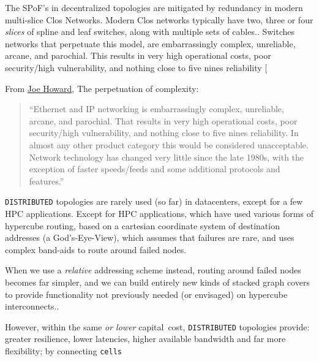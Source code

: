 \documentclass[../HFT-main.tex]{subfiles}
\begin{document}
 The SPoF's in decentralized topologies are mitigated by redundancy in modern multi-slice Clos Networks. Modern Clos networks typically have two, three or four \emph{slices} of spline and leaf switches, along with multiple sets of cables..
Switches  networks that perpetuate this model, are embarrassingly complex, unreliable, arcane, and parochial. This results in very high operational costs, poor security/high vulnerability, and nothing close to five nines reliability
 [{From \href{https://www.linkedin.com/pulse/why-network-industry-has-been-stuck-1980s-ciscos-embrace-joe-howard}{Joe Howard}, The perpetuation of complexity:
 
 
\begin{quotation}
\noindent  ``Ethernet and IP networking is embarrassingly complex, unreliable, arcane, and parochial. That results in very high operational costs, poor security/high vulnerability, and nothing close to five nines reliability. In almost any other product category this would be considered unacceptable. Network technology has changed very little since the late 1980s, with the exception of faster speeds/feeds and some additional protocols and features.''
\end{quotation}}

%
\texttt{DISTRIBUTED} topologies are rarely used (so far) in datacenters, except for a few HPC applications. Except for HPC applications, which have used various forms of hypercube routing, based on a cartesian coordinate system of destination addresses (a God's-Eye-View), which assumes that failures are rare, and uses complex band-aids to route around failed nodes. 

When we use a \emph{relative} addressing scheme instead, routing around failed nodes becomes far simpler, and we can build entirely new kinds of stacked graph covers to provide functionality not previously needed (or envisaged) on hypercube interconnects.. 

However, within the same \emph{or lower} capital~cost, \texttt{DISTRIBUTED} topologies provide: greater resilience, lower latencies, higher available bandwidth and far more flexibility; by connecting \texttt{cells}
\end{document}
